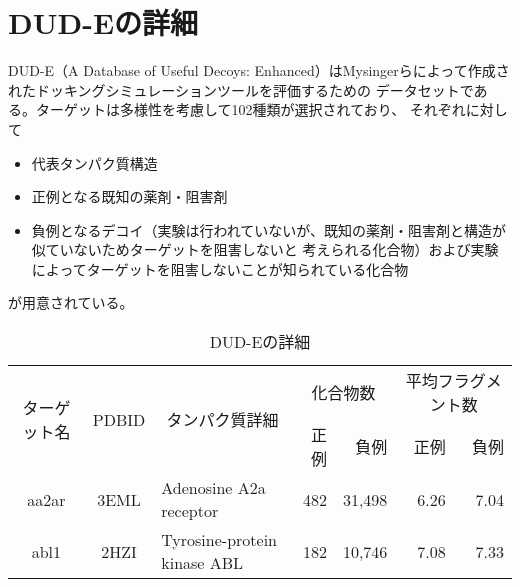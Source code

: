 \appendix
\chapter{DUD-Eの詳細}\label{appendix:dude}
DUD-E（A Database of Useful Decoys: Enhanced）はMysingerらによって作成されたドッキングシミュレーションツールを評価するための
データセットである\cite{Mysinger2012}。ターゲットは多様性を考慮して102種類が選択されており、
それぞれに対して
\begin{itemize}
\item 代表タンパク質構造
\item 正例となる既知の薬剤・阻害剤
\item 負例となるデコイ（実験は行われていないが、既知の薬剤・阻害剤と構造が似ていないためターゲットを阻害しないと
	考えられる化合物）および実験によってターゲットを阻害しないことが知られている化合物
\end{itemize}
が用意されている。
\begin{table}[htb] \centering
	\caption{DUD-Eの詳細}
	\label{tb:dude_description}
	\begin{tabular}{c|c|p{5cm}|rr|rr}
	\hline
	\multirow{2}{*}{ターゲット名}	&\multirow{2}{*}{PDBID}	&\multicolumn{1}{c|}{\multirow{2}{*}{タンパク質詳細}}	&\multicolumn{2}{c|}{化合物数}	&\multicolumn{2}{c}{平均フラグメント数}		\\
							&					&											&正例	&負例				&正例	&負例						\\ \hline
	aa2ar					&3EML				&Adenosine A2a receptor						&482	&31,498				&6.26	&7.04						\\
	abl1						&2HZI				&Tyrosine-protein kinase ABL					&182	&10,746				&7.08	&7.33						\\ \hline
	\end{tabular}
\end{table}

